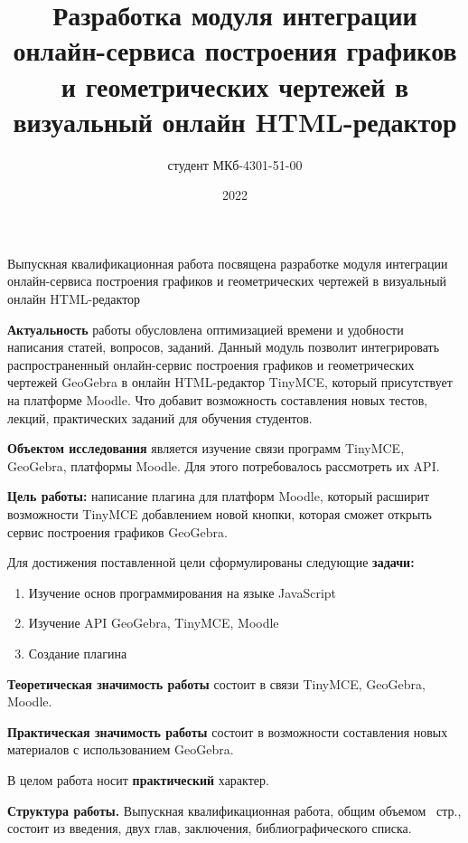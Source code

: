 \documentclass[14pt,Diplom]{diplomwork}
\date{2022}
\author{студент МКб-4301-51-00}{Мельков Алексей Константинович}
\title{Разработка модуля интеграции онлайн-сервиса построения графиков и геометрических чертежей в визуальный онлайн HTML-редактор}
\institute{математики и информационных систем}
\begin{document}
	
\maketitle
\makereferat		%
\newpage

\tableofcontents


Выпускная квалификационная работа посвящена разработке модуля интеграции онлайн-сервиса построения графиков и геометрических чертежей в визуальный онлайн HTML-редактор


\textbf{Актуальность} работы обусловлена оптимизацией времени и удобности написания статей, вопросов, заданий. Данный модуль позволит интегрировать распространенный онлайн-сервис построения графиков и геометрических чертежей GeoGebra в онлайн HTML-редактор TinyMCE, который присутствует на платформе Moodle. Что добавит возможность составления новых тестов, лекций, практических заданий для обучения студентов.

\textbf{Объектом исследования} является изучение связи программ TinyMCE, GeoGebra, платформы Moodle. Для этого потребовалось рассмотреть их API.

\textbf{Цель работы:} написание плагина для платформ Moodle, который расширит возможности TinyMCE добавлением новой кнопки, которая сможет открыть сервис построения графиков GeoGebra.

Для достижения поставленной цели сформулированы следующие \mbox{\textbf{задачи:}}

\begin{enumerate}
	\item Изучение основ программирования на языке JavaScript
	\item Изучение API GeoGebra, TinyMCE, Moodle
	\item Создание плагина
\end{enumerate}



\textbf{Теоретическая значимость работы} состоит в связи TinyMCE, GeoGebra, Moodle.

\textbf{Практическая значимость работы} состоит в возможности составления новых материалов с использованием GeoGebra.

В целом работа носит \textbf{практический} характер.



\textbf{Структура работы.} Выпускная квалификационная работа, общим объемом \pageref{LastPage}~стр., состоит из введения, двух глав, заключения, библиографического списка.
\end{document}
